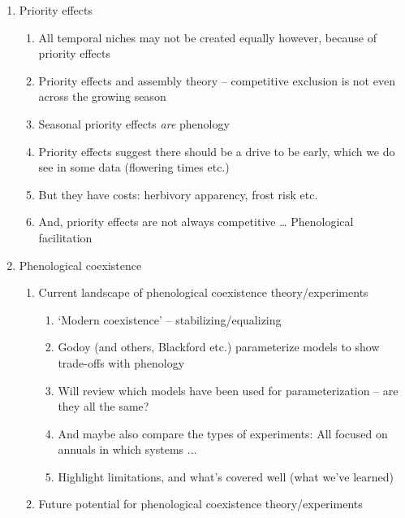 \documentclass[11pt]{article}
\begin{document}
\begin{enumerate}
\begin{enumerate}
\end{enumerate}
\item Priority effects %
\begin{enumerate}
\item All temporal niches may not be created equally however, because of priority effects 
\item Priority effects and assembly theory – competitive exclusion is not even across the growing season %
\item Seasonal priority effects \emph{are} phenology \citep{connolly1999,fukami2015} %
\item Priority effects suggest there should be a drive to be early, which we do see in some data (flowering times etc.) %
\item But they have costs: herbivory apparency, frost risk etc. 
\item And, priority effects are not always competitive … Phenological facilitation \cite{leverett2017}
\end{enumerate}
\item Phenological coexistence
\begin{enumerate}
\item Current landscape of phenological coexistence theory/experiments
\begin{enumerate}
\item `Modern coexistence' -- stabilizing/equalizing 
\item Godoy (and others, Blackford etc.) parameterize models to show trade-offs with phenology %
\item Will review which models have been used for parameterization -- are they all the same?
\item And maybe also compare the types of experiments: All focused on annuals in  which systems ...
\item Highlight limitations, and what's covered well (what we've learned) %
\end{enumerate}
\item Future potential for phenological coexistence theory/experiments

\end{enumerate}
\end{enumerate}
\end{document}
